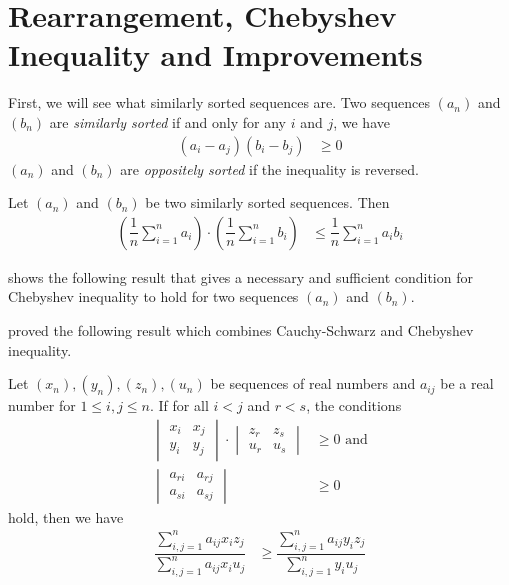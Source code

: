 \documentclass{subfile}
\begin{document}
	\section[Rearrangement and Chebyshev]{Rearrangement, Chebyshev Inequality and Improvements}\label{sec:rearragement}
	First, we will see what similarly sorted sequences are.
			Two sequences $(a_n)$ and $(b_n)$ are \textit{similarly sorted} if and only for any $i$ and $j$, we have
				\begin{align*}
					(a_i-a_j)(b_i-b_j)
						& \geq0
				\end{align*}
			$(a_n)$ and $(b_n)$ are \textit{oppositely sorted} if the inequality is reversed.
	
		\begin{theorem}
			Let $(a_n)$ and $(b_n)$ be two similarly sorted sequences. Then
				\begin{align*}
					\left(\dfrac{1}{n}\sum_{i=1}^na_i\right)\cdot\left(\dfrac{1}{n}\sum_{i=1}^nb_i\right)
						& \leq\dfrac{1}{n}\sum_{i=1}^na_ib_i
				\end{align*}
		\end{theorem}
	\textcite{SASSER1967} shows the following result that gives a necessary and sufficient condition for Chebyshev inequality to hold for two sequences $(a_n)$ and $(b_n)$.
		\begin{theorem}
			
		\end{theorem}
	\textcite{Seitz1936} proved the following result which combines Cauchy-Schwarz and Chebyshev inequality.
		\begin{theorem}
			Let $(x_n),(y_n),(z_n),(u_n)$ be sequences of real numbers and $a_{ij}$ be a real number for $1\leq i,j\leq n$. If for all $i<j$ and $r<s$, the conditions
				\begin{align*}
					\begin{vmatrix}
						x_i & x_j\\
						y_i & y_j
					\end{vmatrix}\cdot
					\begin{vmatrix}
						z_r & z_s\\
						u_r & u_s
					\end{vmatrix}
						& \geq0\mbox{ and}\\
					\begin{vmatrix}
						a_{ri} & a_{rj}\\
						a_{si} & a_{sj}
					\end{vmatrix}
						& \geq0
				\end{align*}
			hold, then we have
				\begin{align*}
					\dfrac{\sum_{i,j=1}^na_{ij}x_iz_j}{\sum_{i,j=1}^na_{ij}x_iu_j}
						& \geq\dfrac{\sum_{i,j=1}^na_{ij}y_iz_j}{\sum_{i,j=1}^ny_iu_j}
				\end{align*}
		\end{theorem}
\end{document}
